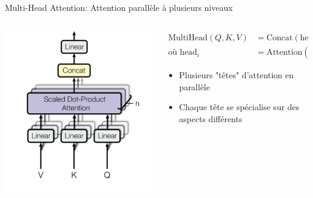 \documentclass[aspectratio=169]{beamer}
\begin{document}
\begin{frame}{Multi-Head Attention: Attention parallèle à plusieurs niveaux}
    \begin{columns}
        \begin{column}{0.4\textwidth}
            \begin{center}
                \includegraphics[width=\textwidth]{images/multi_head.png}
            \end{center}
        \end{column}
        \begin{column}{0.6\textwidth}
            \begin{align*}
                \text{MultiHead}(Q, K, V) &= \text{Concat}(\text{head}_1, ..., \text{head}_h)W^O \\
                \text{où head}_i &= \text{Attention}(QW^Q_i, KW^K_i, VW^V_i)
            \end{align*}
            \begin{itemize}
                \item Plusieurs "têtes" d'attention en parallèle
                \item Chaque tête se spécialise sur des aspects différents

\end{itemize}
\end{column}
\end{columns}
\end{frame}
\end{document}
